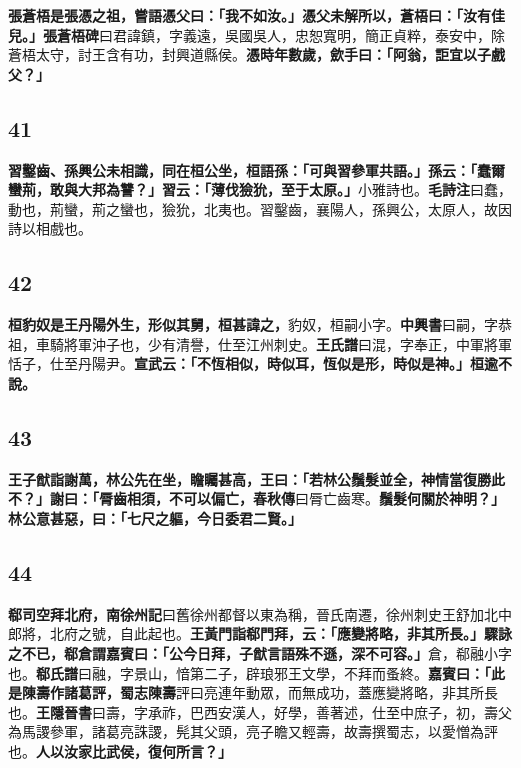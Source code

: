 \textbf{張蒼梧是張憑之祖，嘗語憑父曰：「我不如汝。」憑父未解所以，蒼梧曰：「汝有佳兒。」}{\footnotesize \textbf{張蒼梧碑}曰君諱鎮，字義遠，吳國吳人，忠恕寬明，簡正貞粹，泰安中，除蒼梧太守，討王含有功，封興道縣侯。}\textbf{憑時年數歲，歛手曰：「阿翁，詎宜以子戲父？」}

\subsection*{41}

\textbf{習鑿齒、孫興公未相識，同在桓公坐，桓語孫：「可與習參軍共語。」孫云：「蠢爾蠻荊，敢與大邦為讐？」習云：「薄伐獫狁，至于太原。」}{\footnotesize 小雅詩也。\textbf{毛詩注}曰蠢，動也，荊蠻，荊之蠻也，獫狁，北夷也。習鑿齒，襄陽人，孫興公，太原人，故因詩以相戲也。}

\subsection*{42}

\textbf{桓豹奴是王丹陽外生，形似其舅，桓甚諱之，}{\footnotesize 豹奴，桓嗣小字。\textbf{中興書}曰嗣，字恭祖，車騎將軍沖子也，少有清譽，仕至江州刺史。\textbf{王氏譜}曰混，字奉正，中軍將軍恬子，仕至丹陽尹。}\textbf{宣武云：「不恆相似，時似耳，恆似是形，時似是神。」桓逾不說。}

\subsection*{43}

\textbf{王子猷詣謝萬，林公先在坐，瞻矚甚高，王曰：「若林公鬚髮並全，神情當復勝此不？」謝曰：「脣齒相須，不可以偏亡，}{\footnotesize \textbf{春秋傳}曰脣亡齒寒。}\textbf{鬚髮何關於神明？」林公意甚惡，曰：「七尺之軀，今日委君二賢。」}

\subsection*{44}

\textbf{郗司空拜北府，}{\footnotesize \textbf{南徐州記}曰舊徐州都督以東為稱，晉氏南遷，徐州刺史王舒加北中郎將，北府之號，自此起也。}\textbf{王黃門詣郗門拜，云：「應變將略，非其所長。」驟詠之不已，郗倉謂嘉賓曰：「公今日拜，子猷言語殊不遜，深不可容。」}{\footnotesize 倉，郗融小字也。\textbf{郗氏譜}曰融，字景山，愔第二子，辟琅邪王文學，不拜而蚤終。}\textbf{嘉賓曰：「此是陳壽作諸葛評，}{\footnotesize \textbf{蜀志陳壽}評曰亮連年動眾，而無成功，蓋應變將略，非其所長也。\textbf{王隱晉書}曰壽，字承祚，巴西安漢人，好學，善著述，仕至中庶子，初，壽父為馬謖參軍，諸葛亮誅謖，髡其父頭，亮子瞻又輕壽，故壽撰蜀志，以愛憎為評也。}\textbf{人以汝家比武侯，復何所言？」}

